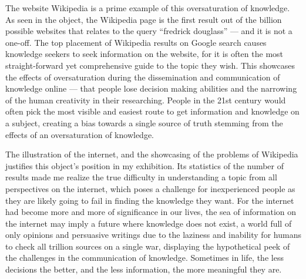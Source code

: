 \documentclass[a4paper,11pt]{article}
\begin{document}
The website Wikipedia is a prime example of this oversaturation of knowledge. As seen in the object, the Wikipedia page is the first result out of the billion possible websites that relates to the query ``fredrick douglass'' --- and it is not a one-off. The top placement of Wikipedia results on Google search causes knowledge seekers to seek information on the website, for it is often the most straight-forward yet comprehensive guide to the topic they wish. This showcases the effects of oversaturation during the dissemination and communication of knowledge online --- that people lose decision making abilities and the narrowing of the human creativity in their researching. People in the 21st century would often pick the most visible and easiest route to get information and knowledge on a subject, creating a bias towards a single source of truth stemming from the effects of an oversaturation of knowledge.

The illustration of the internet, and the showcasing of the problems of Wikipedia justifies this object's position in my exhibition. Its statistics of the number of results made me realize the true difficulty in understanding a topic from all perspectives on the internet, which poses a challenge for inexperienced people as they are likely going to fail in finding the knowledge they want. For the internet had become more and more of significance in our lives, the sea of information on the internet may imply a future where knowledge does not exist, a world full of only opinions and persuasive writings due to the laziness and inability for humans to check all trillion sources on a single war, displaying the hypothetical peek of the challenges in the communication of knowledge. Sometimes in life, the less decisions the better, and the less information, the more meaningful they are.


\end{document}
